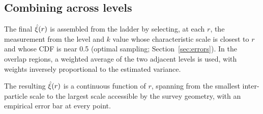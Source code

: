 \subsection{Combining across levels}
\label{sec:combining}

The final $\hat{\xi}(r)$ is assembled from the ladder by selecting, at each $r$, the measurement from the level and $k$ value whose characteristic scale is closest to $r$ and whose CDF is near 0.5 (optimal sampling; Section~\ref{sec:errors}).  In the overlap regions, a weighted average of the two adjacent levels is used, with weights inversely proportional to the estimated variance.

The resulting $\hat{\xi}(r)$ is a continuous function of $r$, spanning from the smallest inter-particle scale to the largest scale accessible by the survey geometry, with an empirical error bar at every point.
